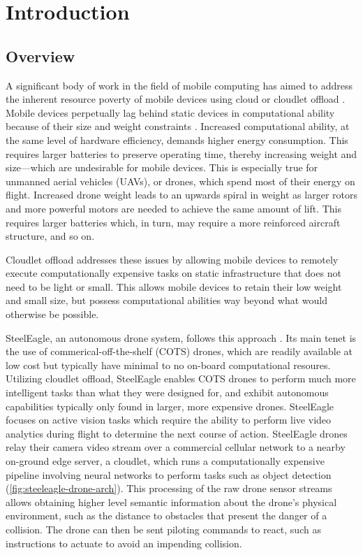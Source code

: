 \chapter{Introduction}
\section{Overview}
\label{sec:overview}
A significant body of work in the field of mobile computing has aimed to
address the inherent resource poverty of mobile devices using cloud or cloudlet
offload \cite{satya1996,satya2009}. Mobile devices perpetually lag behind
static devices in computational ability because of their size and weight
constraints \cite{satya2014}. Increased computational ability, at the same
level of hardware efficiency, demands higher energy consumption. This requires
larger batteries to preserve operating time, thereby increasing weight and
size---which are undesirable for mobile devices.  This is especially true for
unmanned aerial vehicles (UAVs), or drones, which spend most of their energy on
flight.  Increased drone weight leads to an upwards spiral in weight as larger
rotors and more powerful motors are needed to achieve the same amount of lift.
This requires larger batteries which, in turn, may require a more reinforced
aircraft structure, and so on.

Cloudlet offload addresses these issues by allowing mobile devices to remotely
execute computationally expensive tasks on static infrastructure that does not
need to be light or small. This allows mobile devices to retain their low
weight and small size, but possess computational abilities way beyond what
would otherwise be possible.

SteelEagle, an autonomous drone system, follows this approach \cite{bala2024}.
Its main tenet is the use of commerical-off-the-shelf (COTS) drones, which are
readily available at low cost but typically have minimal to no on-board
computational resoures.  Utilizing cloudlet offload, SteelEagle enables COTS
drones to perform much more intelligent tasks than what they were designed for,
and exhibit autonomous capabilities typically only found in larger, more
expensive drones.  SteelEagle focuses on active vision tasks which require the
ability to perform live video analytics during flight to determine the next
course of action. SteelEagle drones relay their camera video stream over a
commercial cellular network to a nearby on-ground edge server, a cloudlet,
which runs a computationally expensive pipeline involving neural networks to
perform tasks such as object detection (\cref{fig:steeleagle-drone-arch}).  This processing of the raw drone
sensor streams allows obtaining higher level semantic information about the
drone's physical environment, such as the distance to obstacles that present
the danger of a collision. The drone can then be sent piloting commands to
react, such as instructions to actuate to avoid an impending collision.

